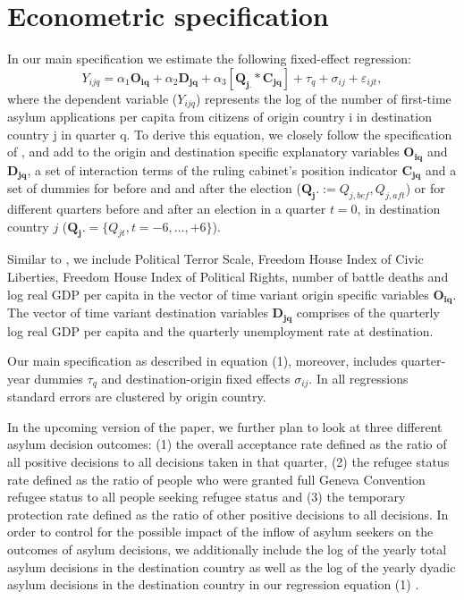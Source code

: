 \documentclass[a4paper,12pt]{article}
\begin{document}
\section{Econometric specification} \label{sec:econometric}
In our main specification we estimate the following fixed-effect regression:
\begin{equation}
Y_{ijq} =\alpha_1 \mathbf{O_{iq}} + \alpha_2 \mathbf{D_{jq}} + \alpha_3 [\mathbf{Q_{j.}} *  \mathbf{C_{jq}}] + \tau_q + \sigma_{ij} +  \varepsilon_{ijt},
\end{equation}where the dependent variable ($Y_{ijq}$) represents the log of the number of first-time asylum applications per capita from citizens of origin country i in destination country j in quarter q. To derive this equation, we closely follow the specification of \cite{hatton2016}, and add to the origin and destination specific explanatory variables $\mathbf{O_{iq}}$ and $\mathbf{D_{jq}}$, a set of interaction terms of the ruling cabinet's position indicator $\mathbf{C_{jq}}$
 and  a set of dummies for before and and after the election ($\mathbf{Q_j.} := Q_{j,bef},  Q_{j,aft}$) or for different quarters before and after an election in a quarter $t=0$, in destination country $j$ ($\mathbf{Q_j.} =\{Q_{jt}, t = -6, \ldots, +6\}$).
 
  Similar to \cite{hatton2016}, we include Political Terror Scale, Freedom House Index of Civic Liberties, Freedom House Index of  Political Rights, number of battle deaths and log real GDP per capita in the vector of time variant origin specific variables $\mathbf{O_{iq}}$. The vector of time variant destination variables $\mathbf{D_{jq}}$ comprises of the quarterly log real GDP per capita and the quarterly unemployment rate at destination. 
  
 Our main specification as described in equation (1), moreover, includes quarter-year dummies $\tau_q$ and destination-origin fixed effects $\sigma_{ij}$. In all regressions standard errors are clustered by origin country.
 
 In the upcoming version of the paper, we further plan to look at three different asylum decision outcomes: (1) the overall acceptance rate defined as the ratio of all positive decisions to all decisions taken in that quarter, (2) the refugee status rate defined as the ratio of people who were granted full Geneva Convention refugee status to all people seeking refugee status and (3) the temporary protection rate defined as the ratio of other positive decisions to all decisions.  In order to control for the possible impact of the inflow of asylum seekers on the outcomes of asylum decisions, we additionally include  the log of the yearly total asylum decisions in the destination country as well as the log of  the yearly dyadic asylum decisions in the destination country in our regression equation (1) . 
\end{document}
